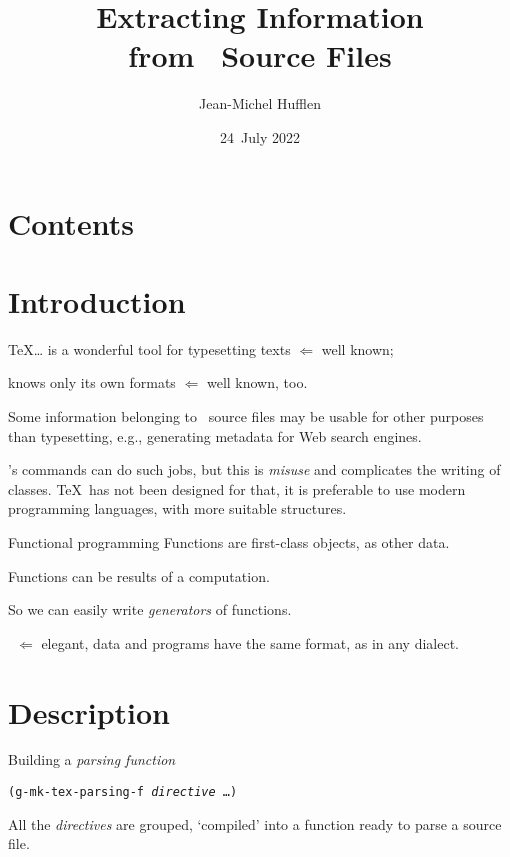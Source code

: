 \documentclass[pdf]{beamer}
\title{Extracting Information \\ from \AllTeXplus\ Source Files}
\author{Jean-Michel Hufflen}
\date{24~July 2022}
\institute{TUG 2022}
\begin{document}
\frame{\titlepage}

\section*{Contents}

\begin{frame}
\tableofcontents[]
\end{frame}

\section{Introduction}

\begin{frame}{\TeX\ldots}
is a wonderful tool for typesetting texts $\Longleftarrow$ well known;\pause

knows only its own formats $\Longleftarrow$ well known, too.\pause

Some information belonging to \AllTeX\ source files may be usable for other
purposes than typesetting, e.g., generating metadata for Web search
engines.\pause

\AllTeX's commands can do such jobs, but this is \emph{misuse} and complicates
the writing of classes. \TeX\ has not been designed for that, it is preferable
to use modern programming languages, with more suitable structures.
\end{frame}

\begin{frame}{Functional programming}
Functions are first-class objects, as other data.\pause

Functions can be results of a computation.\pause

So we can easily write \emph{generators} of functions.\pause

\pgScheme\ $\Longleftarrow$ elegant, data and programs have the same format, as
in any  dialect.
\end{frame}

\section{Description}

\begin{frame}{Building a \emph{parsing function}}
\begin{center}
\texttt{(g-mk-tex-parsing-f \textsl{directive} \ldots)}
\end{center}
All the \emph{directives} are grouped, `compiled' into a function ready to
parse a source file.
\end{frame}
\end{document}
